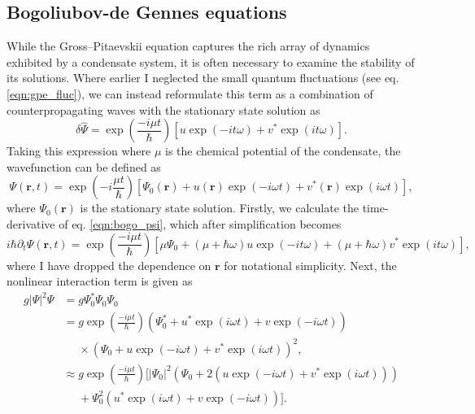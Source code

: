 \subsection{Bogoliubov-de Gennes equations}
\label{sec:bogo}
While the Gross--Pitaevskii equation captures the rich array of dynamics exhibited by a condensate system, it is often necessary to examine the stability of its solutions. Where earlier I neglected the small quantum fluctuations (see eq. \ref{eqn:gpe_fluc}), we can instead reformulate this term as a combination of counterpropagating waves with the stationary state solution as
\begin{equation}
    \delta\hat{\Psi} = \exp\left(\frac{-i\mu t}{\hbar}\right)[u\exp(-it\omega) + v^{*}\exp(it\omega)].
\end{equation}
Taking this expression where $\mu$ is the chemical potential of the condensate, the wavefunction can be defined as
\begin{equation}\label{eqn:bogo_psi}
\Psi(\mathbf{r},t) = \exp\left(-i\frac{\mu t}{\hbar}\right)[\Psi_0(\mathbf{r}) + u(\mathbf{r})\exp\left(-i\omega t\right) + v^{*}(\mathbf{r})\exp\left(i\omega t\right) ],
\end{equation}
where $\Psi_0(\mathbf{r})$ is the stationary state solution. Firstly, we calculate the time-derivative of eq. \ref{eqn:bogo_psi}, which after simplification becomes
\begin{equation}\label{eqn:bogo_lhs}
    i\hbar\partial_t \Psi(\mathbf{r},t) = \exp\left(\frac{-i\mu t}{\hbar}\right)\left[\mu\Psi_0 + (\mu+\hbar\omega)u\exp\left(-it\omega\right) + (\mu+\hbar\omega)v^{*}\exp\left(it\omega\right) \right],
\end{equation}
where I have dropped the dependence on $\mathbf{r}$ for notational simplicity. Next, the nonlinear interaction term is given as
\begin{subequations}
\begin{align}\label{eqn:bogo_nonlin}
    g|\Psi|^2\Psi &= g\Psi_0^{*}\Psi_0\Psi_0 \\
    &= g\exp\left(\frac{-i\mu t}{\hbar}\right)(\Psi_0^{*} + u^{*}\exp(i\omega t) + v\exp(-i\omega t))\\ &~~~~~~\times (\Psi_0 + u\exp(-i\omega t) + v^{*}\exp(i\omega t))^2, \nonumber \\
    & \approx g\exp\left(\frac{-i\mu t}{\hbar}\right)[|\Psi_0|^2(\Psi_0 + 2(u\exp(-i\omega t) + v^{*}\exp(i\omega t) )) \\ &~~~~~~+ \Psi_0^2( u^{*}\exp(i\omega t) + v\exp(-i\omega t))]. \nonumber
\end{align}
\end{subequations}

